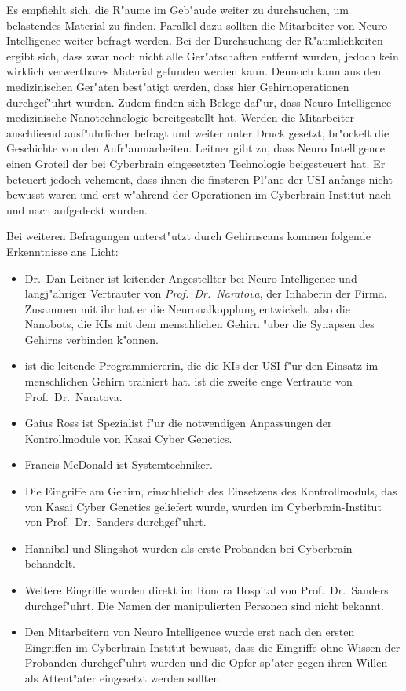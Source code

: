 Es empfiehlt sich, die R"aume im Geb"aude weiter zu durchsuchen, um belastendes Material zu finden. Parallel dazu sollten die Mitarbeiter von Neuro Intelligence weiter befragt werden. Bei der Durchsuchung der R"aumlichkeiten ergibt sich, dass zwar noch nicht alle Ger"atschaften entfernt wurden, jedoch kein wirklich verwertbares Material gefunden werden kann. Dennoch kann aus den medizinischen Ger"aten best"atigt werden, dass hier Gehirnoperationen durchgef"uhrt wurden. Zudem finden sich Belege daf"ur, dass Neuro Intelligence medizinische Nanotechnologie bereitgestellt hat. Werden die Mitarbeiter anschlie\3end ausf"uhrlicher befragt und weiter unter Druck gesetzt, br"ockelt die Geschichte von den Aufr"aumarbeiten. Leitner gibt zu, dass Neuro Intelligence einen Gro\3teil der bei Cyberbrain eingesetzten Technologie beigesteuert hat. Er beteuert jedoch vehement, dass ihnen die finsteren Pl"ane der USI anfangs nicht bewusst waren und erst w"ahrend der Operationen im Cyberbrain-Institut nach und nach aufgedeckt wurden.

Bei weiteren Befragungen unterst"utzt durch Gehirnscans kommen folgende Erkenntnisse ans Licht:

\begin{itemize}
	\item Dr.~Dan Leitner ist leitender Angestellter bei Neuro Intelligence und langj"ahriger Vertrauter von \emph{Prof.~Dr.~Naratova}, der 
		Inhaberin der Firma. Zusammen mit ihr hat er die Neuronalkopplung entwickelt, also die Nanobots, die KIs mit dem menschlichen Gehirn "uber die Synapsen des Gehirns verbinden k"onnen.
	\item \ml{} ist die leitende Programmiererin, die die KIs der USI f"ur den Einsatz im menschlichen Gehirn trainiert hat. \ml{} ist die 
		zweite enge Vertraute  von Prof.~Dr.~Naratova.
	\item Gaius Ross ist Spezialist f"ur die notwendigen Anpassungen der Kontrollmodule von Kasai Cyber Genetics.
	\item Francis McDonald ist Systemtechniker.
	\item Die Eingriffe am Gehirn, einschlie\3lich des Einsetzens des Kontrollmoduls, das von Kasai Cyber Genetics geliefert wurde, wurden 
		im Cyberbrain-Institut von Prof.~Dr.~Sanders durchgef"uhrt.
	\item Hannibal und Slingshot wurden als erste Probanden bei Cyberbrain behandelt.
	\item Weitere Eingriffe wurden direkt im Rondra Hospital von Prof.~Dr.~Sanders durchgef"uhrt. Die Namen der manipulierten Personen sind 
		nicht bekannt.
	\item Den Mitarbeitern von Neuro Intelligence wurde erst nach den ersten Eingriffen im Cyberbrain-Institut bewusst, dass die Eingriffe 
		ohne Wissen der Probanden durchgef"uhrt wurden und die Opfer sp"ater gegen ihren Willen als Attent"ater eingesetzt werden sollten.
\end{itemize}


